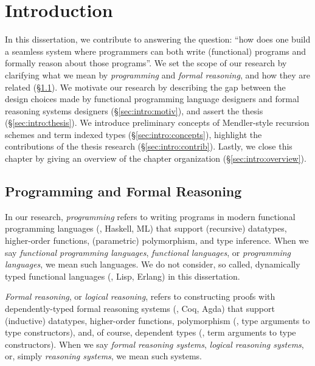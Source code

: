 \chapter{Introduction}\label{ch:intro}

In this dissertation, we contribute to answering the question:
``how does one build a seamless system where programmers can both
write (functional) programs and formally reason about those programs''.
We set the scope of our research by clarifying what we mean by
\emph{programming} and \emph{formal reasoning}, and
how they are related (\S\ref{sec:intro:scope}).
We motivate our research by describing the gap between
the design choices made by functional programming language designers
and formal reasoning systems designers (\S\ref{sec:intro:motiv}),
and assert the thesis (\S\ref{sec:intro:thesis}).
We introduce preliminary concepts of Mendler-style recursion schemes
and term indexed types (\S\ref{sec:intro:concepts}), highlight
the contributions of the thesis research (\S\ref{sec:intro:contrib}).
Lastly, we close this chapter by giving an overview of
the chapter organization (\S\ref{sec:intro:overview}).

\section{Programming and Formal Reasoning}\label{sec:intro:scope}

In our research, \emph{programming} refers to writing programs in
modern functional programming languages (\eg, Haskell, ML) that support
(recursive) datatypes, higher-order functions, (parametric) polymorphism,
and type inference. When we say \emph{functional programming languages},
\emph{functional languages}, or \emph{programming languages},
we mean such languages. We do not consider,
so called, dynamically typed functional languages (\eg, Lisp, Erlang)
in this dissertation.

\emph{Formal reasoning}, or \emph{logical reasoning},
refers to constructing proofs with depend\-ently-typed formal reasoning systems
(\eg, Coq, Agda) that support (inductive) datatypes, higher-order functions,
polymorphism (\ie, type arguments to type constructors), and, of course,
dependent types (\ie, term arguments to type constructors). When we say
\emph{formal reasoning systems}, \emph{logical reasoning systems},
or, simply \emph{reasoning systems}, we mean such systems.


